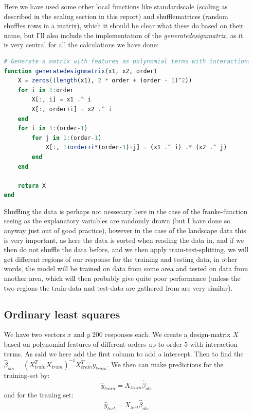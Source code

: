 \documentclass{article}
\begin{document}
Here we have used some other local functions like standardscale (scaling as
described in the scaling section in this report) and shufflematrices (random
shuffles rows in a matrix), which it should be clear what these do based on
their name, but I'll also include the implementation of the
\textit{generatedesignmatrix}, as it is very central for all the calculations we
have done:
\begin{lstlisting}[language=julia]
# Generate a matrix with features as polynomial terms with interactions
function generatedesignmatrix(x1, x2, order)
    X = zeros((length(x1), 2 * order + (order - 1)^2))
    for i in 1:order
        X[:, i] = x1 .^ i
        X[:, order+i] = x2 .^ i
    end
    for i in 1:(order-1)
        for j in 1:(order-1)
            X[:, 1+order+i*(order-1)+j] = (x1 .^ i) .* (x2 .^ j)
        end
    end

    return X
end
\end{lstlisting}

Shuffling the data is perhaps not nessecary here in the case of the
franke-function seeing as the explanatory variables are randomly drawn (but I
have done so anyway just out of good practice), however in the case of the
landscape data this is very important, as here the data is sorted when reading
the data in, and if we then do not shuffle the data before, and we then apply
train-test-splitting, we will get different regions of our response for the
training and testing data, in other words, the model will be trained on data
from some area and tested on data from another area, which will then probably
give quite poor performance (unless the two regions the train-data and test-data
are gathered from are very similar).


\subsection{Ordinary least squares}
We have two vectors $x$ and $y$ $200$ responses each. We create a design-matrix
$X$ based on polynomial features of different orders up to order $5$ with
interaction terms. As said we here add the first column to add a intercept. Then
to find the $\hat{\beta}_{ols} = (X^T_{train} X_{train})^{-1} X^T_{train}
    y_{train}$. We then can make predictions for the training-set by:
$$\hat{y}_{train} = X_{train} \hat{\beta}_{ols}$$
and for the traning set:
$$\hat{y}_{test} = X_{test} \hat{\beta}_{ols}$$
\end{document}
